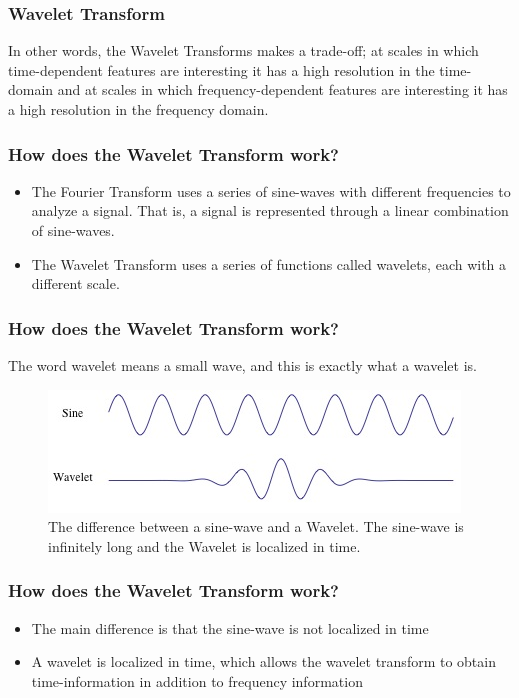 \documentclass{beamer}
\begin{document}
\begin{frame}
	\frametitle{Wavelet Transform}
	
	In other words, the Wavelet Transforms makes a trade-off; at scales in which time-dependent features are interesting it has a high resolution in the time-domain and at scales in which frequency-dependent features are interesting it has a high resolution in the frequency domain.
	
	
	
\end{frame}

\begin{frame}
	\frametitle{How does the Wavelet Transform work?}
	\begin{itemize}
		\item
		The Fourier Transform uses a series of sine-waves with different frequencies to analyze a signal. That is, a signal is represented through a linear combination of sine-waves.
		
		\item
		
		The Wavelet Transform uses a series of functions called wavelets, each with a different scale.
		
	\end{itemize}
	
\end{frame}


\begin{frame}
	\frametitle{How does the Wavelet Transform work?}
	The word wavelet means a small wave, and this is exactly what a wavelet is.
	\begin{center}
		\begin{figure}\label{fig6}
			\includegraphics[scale=0.5]{Wavelet-Out1.jpg}
			\caption{ The difference between a sine-wave and a Wavelet. The sine-wave is infinitely long and the Wavelet is localized in time.}
		\end{figure}
	\end{center}
	
\end{frame}

\begin{frame}
	\frametitle{How does the Wavelet Transform work?}
	
	\begin{itemize}
		\item
		 The main difference is that the sine-wave is not localized in time
		
		\item
		
		A wavelet is localized in time, which allows the wavelet transform to obtain time-information in addition to frequency information
		
	\end{itemize}

\end{frame}
\end{document}
